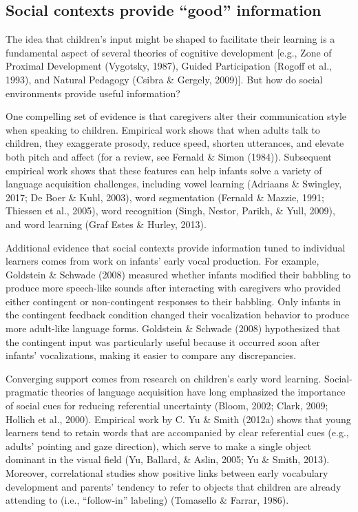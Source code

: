 \documentclass[oneside]{report}
\begin{document}
\hypertarget{social-contexts-provide-good-information}{%
\subsection{Social contexts provide ``good''
information}\label{social-contexts-provide-good-information}}

The idea that children's input might be shaped to facilitate their
learning is a fundamental aspect of several theories of cognitive
development {[}e.g., Zone of Proximal Development (Vygotsky, 1987),
Guided Participation (Rogoff et al., 1993), and Natural Pedagogy (Csibra
\& Gergely, 2009){]}. But how do social environments provide useful
information?

One compelling set of evidence is that caregivers alter their
communication style when speaking to children. Empirical work shows that
when adults talk to children, they exaggerate prosody, reduce speed,
shorten utterances, and elevate both pitch and affect (for a review, see
Fernald \& Simon (1984)). Subsequent empirical work shows that these
features can help infants solve a variety of language acquisition
challenges, including vowel learning (Adriaans \& Swingley, 2017; De
Boer \& Kuhl, 2003), word segmentation (Fernald \& Mazzie, 1991;
Thiessen et al., 2005), word recognition (Singh, Nestor, Parikh, \&
Yull, 2009), and word learning (Graf Estes \& Hurley, 2013).

Additional evidence that social contexts provide information tuned to
individual learners comes from work on infants' early vocal production.
For example, Goldstein \& Schwade (2008) measured whether infants
modified their babbling to produce more speech-like sounds after
interacting with caregivers who provided either contingent or
non-contingent responses to their babbling. Only infants in the
contingent feedback condition changed their vocalization behavior to
produce more adult-like language forms. Goldstein \& Schwade (2008)
hypothesized that the contingent input was particularly useful because
it occurred soon after infants' vocalizations, making it easier to
compare any discrepancies.

Converging support comes from research on children's early word
learning. Social-pragmatic theories of language acquisition have long
emphasized the importance of social cues for reducing referential
uncertainty (Bloom, 2002; Clark, 2009; Hollich et al., 2000). Empirical
work by C. Yu \& Smith (2012a) shows that young learners tend to retain
words that are accompanied by clear referential cues (e.g., adults'
pointing and gaze direction), which serve to make a single object
dominant in the visual field (Yu, Ballard, \& Aslin, 2005; Yu \& Smith,
2013). Moreover, correlational studies show positive links between early
vocabulary development and parents' tendency to refer to objects that
children are already attending to (i.e., ``follow-in'' labeling)
(Tomasello \& Farrar, 1986).
\end{document}
